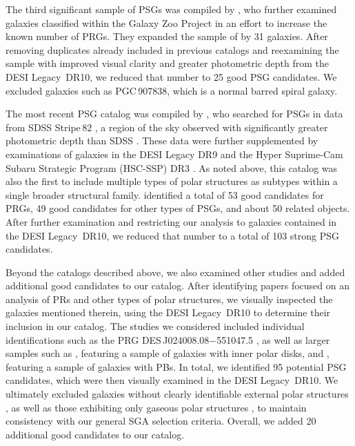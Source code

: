 \documentclass{aa}
\begin{document}
The third significant sample of PSGs  was compiled by \citet{2019MNRAS.483.1470R}, who further examined galaxies classified within the Galaxy Zoo Project in an effort to increase the known number of PRGs. They expanded the sample of \citet{2011MNRAS.418..244M} by 31 galaxies. After removing duplicates already included in previous catalogs and reexamining the sample with improved visual clarity and greater photometric depth from the DESI Legacy~DR10, we reduced that number to 25 good PSG candidates. We excluded galaxies such as PGC\,907838, which is a normal barred spiral galaxy.

The most recent PSG catalog was compiled by \citet{2024A&A...681L..15M}, who searched for PSGs in data from SDSS Stripe\,82 \citep{2016MNRAS.456.1359F}, a region of the sky observed with significantly greater photometric depth than SDSS \citep[up to 1.8\,mag deeper,][]{2019MNRAS.486..390B}. These data were further supplemented by examinations of galaxies in the DESI Legacy DR9 \citep{2019AJ....157..168D} and the Hyper Suprime-Cam Subaru Strategic Program (HSC-SSP) DR3 \citep{2022PASJ...74..247A}. As noted above, this catalog was also the first to include multiple types of polar structures as subtypes within a single broader structural family. \citet{2024A&A...681L..15M} identified a total of 53 good candidates for PRGs, 49 good candidates for other types of PSGs, and about 50 related objects. After further examination and restricting our analysis to galaxies contained in the DESI Legacy~DR10, we reduced that number to a total of 103 strong PSG candidates. 

Beyond the catalogs described above, we also examined other studies and added additional good candidates to our catalog. After identifying papers focused on an analysis of PRs and other types of polar structures, we visually inspected the galaxies mentioned therein, using the DESI Legacy~DR10 to determine their inclusion in our catalog. The studies we considered included individual identifications such as the PRG DES\,J024008.08$-$551047.5 \citep{2024A&A...681A..35A}, as well as larger samples such as \citet{2003A&A...408..873C}, featuring a sample of galaxies with inner polar disks, and \citet{2015AstL...41..748R}, featuring a sample of galaxies with PBs. In total, we identified 95 potential PSG candidates, which were then visually examined in the DESI Legacy~DR10. We ultimately excluded galaxies without clearly identifiable external polar structures \citep[studied, for example, in][]{2003A&A...408..873C,2016AJ....152...73S}, as well as those exhibiting only gaseous polar structures \citep[e.g.,][]{2023MNRAS.525.4663D}, to maintain consistency with our general SGA selection criteria. Overall, we added 20 additional good candidates to our catalog.
\end{document}
